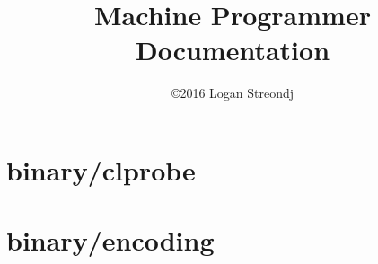 \documentclass[12pt]{report}
\title{Machine Programmer Documentation}
\author{\copyright 2016 Logan Streondj}%
\begin{document}
\maketitle
\tableofcontents


\chapter{binary/clprobe}


\chapter{binary/encoding}

\end{document}
